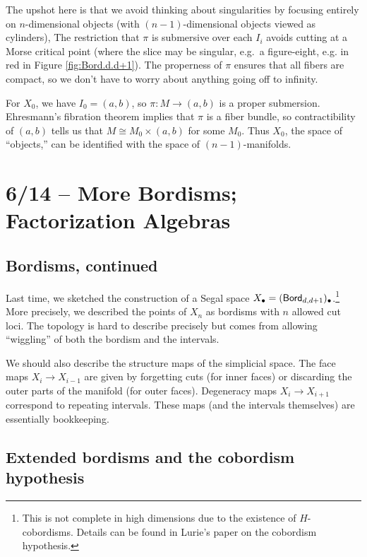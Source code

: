 The upshot here is that we avoid thinking about singularities by focusing entirely on $n$-dimensional objects (with $(n-1)$-dimensional objects viewed as cylinders),
The restriction that $\pi$ is submersive over each $I_i$ avoids cutting at a Morse critical point (where the slice may be singular, e.g.\ a figure-eight, e.g. in red in Figure \ref{fig:Bord.d.d+1}).
The properness of $\pi$ ensures that all fibers are compact, so we don't have to worry about anything going off to infinity.

\begin{ex}
	For $X_0$, we have $I_0 = (a, b)$, so $\pi: M \to (a, b)$ is a proper submersion.
	Ehresmann's fibration theorem implies that $\pi$ is a fiber bundle, so contractibility of $(a, b)$ tells us that $M \cong M_0 \times (a, b)$ for some $M_0$.
	Thus $X_0$, the space of ``objects,'' can be identified with the space of $(n-1)$-manifolds.
\end{ex}

\section{6/14 -- More Bordisms; Factorization Algebras}

\subsection{Bordisms, continued}

Last time, we sketched the construction of a Segal space $X_\bullet = (\mathsf{Bord}_{d,d+1})_\bullet$.\footnote{This is not complete in high dimensions due to the existence of $H$-cobordisms.
Details can be found in Lurie's paper on the cobordism hypothesis.}
More precisely, we described the points of $X_n$ as bordisms with $n$ allowed cut loci.
The topology is hard to describe precisely but comes from allowing ``wiggling'' of both the bordism and the intervals.

We should also describe the structure maps of the simplicial space.
The face maps $X_i \to X_{i-1}$ are given by forgetting cuts (for inner faces) or discarding the outer parts of the manifold (for outer faces).
Degeneracy maps $X_i \to X_{i+1}$ correspond to repeating intervals.
These maps (and the intervals themselves) are essentially bookkeeping.

\subsection{Extended bordisms and the cobordism hypothesis}

